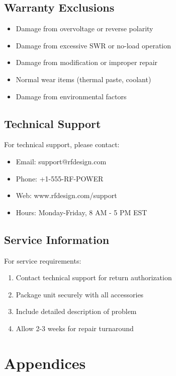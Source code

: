 \documentclass[11pt,a4paper]{article}
\begin{document}
\subsection{Warranty Exclusions}
\begin{itemize}
    \item Damage from overvoltage or reverse polarity
    \item Damage from excessive SWR or no-load operation
    \item Damage from modification or improper repair
    \item Normal wear items (thermal paste, coolant)
    \item Damage from environmental factors
\end{itemize}

\subsection{Technical Support}
For technical support, please contact:
\begin{itemize}
    \item Email: support@rfdesign.com
    \item Phone: +1-555-RF-POWER
    \item Web: www.rfdesign.com/support
    \item Hours: Monday-Friday, 8 AM - 5 PM EST
\end{itemize}

\subsection{Service Information}
For service requirements:
\begin{enumerate}
    \item Contact technical support for return authorization
    \item Package unit securely with all accessories
    \item Include detailed description of problem
    \item Allow 2-3 weeks for repair turnaround
\end{enumerate}

\section{Appendices}
\end{document}
